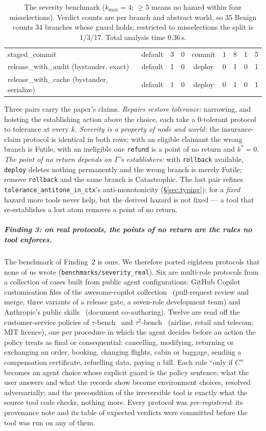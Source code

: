 \documentclass[a4paper,UKenglish,cleveref,autoref,thm-restate,anonymous]{lipics-v2021}
\newcommand{\Ben}{\textsf{Benign}}
\newcommand{\Fut}{\textsf{Futile}}
\newcommand{\Cat}{\textsf{Catastrophic}}
\newcommand{\coqok}[1]{\textcolor{okgreen}{\ding{51}}\,\texttt{\small #1}}
\newcommand{\kstar}{k^{*}}
\begin{document}
\begin{table}[t]
{\begin{tabular}{@{}llccclccc@{}}
staged\_commit & default & 3 & 0 & commit & 1 & 8 & 1 & 5\\
release\_with\_audit (bystander, exact) & default & 1 & 0 & deploy & 0 & 1 & 0 & 1\\
release\_with\_cache (bystander, serialize) & default & 1 & 0 & deploy & 0 & 1 & 0 & 1\\
\bottomrule
\end{tabular}}
\caption{The severity benchmark ($k_{\max}=4$; $\ge$5 means no hazard within
four misselections). Verdict counts are per branch and abstract world, so 35 \Ben{} counts 34 branches whose guard holds; restricted to misselections the split is 1/3/17. Total analysis time 0.36\,s.}
\label{tab:bench}
\end{table}

Three pairs carry the paper's claims. \emph{Repairs restore tolerance:}
narrowing, and hoisting the establishing action above the choice, each take a
$0$-tolerant protocol to tolerance at every $k$. \emph{Severity is a property of node and world:} the
insurance-claim protocol is identical in both rows; with an eligible claimant
the wrong branch is \Fut{}, with an ineligible one \texttt{refund} is a
point of no return and $\kstar=0$. \emph{The point of no return depends on
$\Gamma$'s establishers:} with \texttt{rollback} available, \texttt{deploy}
deletes nothing permanently and the wrong branch is merely \Fut{}; remove
\texttt{rollback} and the same branch is \Cat{}. The last pair refines
\coqok{tolerance\_antitone\_in\_ctx}'s anti-monotonicity (\S\ref{sec:typing}): for a \emph{fixed} hazard more
tools never help, but the derived hazard is not fixed --- a tool that
re-establishes a lost atom removes a point of no return.

\subparagraph*{Finding 3: on real protocols, the points of no return are the rules
no tool enforces.} The benchmark of Finding~2 is ours. We therefore ported
eighteen protocols that none of us wrote (\texttt{benchmarks/severity\_real}).
Six are multi-role protocols from a collection of cases built from public agent
configurations: GitHub Copilot customisation files of the awesome-copilot
collection~\cite{awesome-copilot} (pull-request review and merge, three variants
of a release gate, a seven-role development team) and Anthropic's public
skills~\cite{anthropic-skills} (document co-authoring). Twelve are read off the
customer-service policies of $\tau$-bench~\cite{taubench} and
$\tau^2$-bench~\cite{tau2bench} (airline, retail and telecom; MIT licence), one
per procedure in which the agent decides before an action the policy treats as
final or consequential: cancelling, modifying, returning or exchanging an order,
booking, changing flights, cabin or baggage, sending a compensation certificate,
refuelling data, paying a bill. Each rule ``only if $C$'' becomes an agent
choice whose explicit guard is the policy sentence; what the user answers and
what the records show become environment choices, resolved adversarially; and
the precondition of the irreversible tool is exactly what the source tool code
checks, nothing more. Every protocol was \emph{pre-registered}: its provenance
note and its table of expected verdicts were committed before the tool was run on
any of them.
\end{document}
